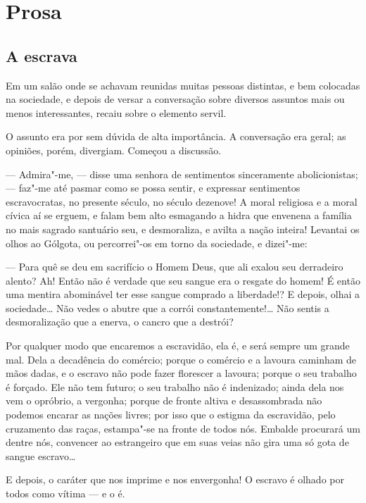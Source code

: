 \part{Prosa}

\chapter{A escrava}

Em um salão onde se achavam reunidas muitas pessoas distintas, e bem
colocadas na sociedade, e depois de versar a conversação sobre diversos
assuntos mais ou menos interessantes, recaiu sobre o elemento servil.

O assunto era por sem dúvida de alta importância. A conversação era
geral; as opiniões, porém, divergiam. Começou a discussão.

--- Admira"-me, --- disse uma senhora de sentimentos sinceramente
abolicionistas; --- faz"-me até pasmar como se possa sentir, e expressar
sentimentos escravocratas, no presente século, no século dezenove! A
moral religiosa e a moral cívica aí se erguem, e falam bem alto
esmagando a hidra que envenena a família no mais sagrado santuário seu,
e desmoraliza, e avilta a nação inteira! Levantai os olhos ao Gólgota,
ou percorrei"-os em torno da sociedade, e dizei"-me:

--- Para quê se deu em sacrifício o Homem Deus, que ali exalou seu
derradeiro alento? Ah! Então não é verdade que seu sangue era o resgate
do homem! É então uma mentira abominável ter esse sangue comprado a
liberdade!? E depois, olhai a sociedade\ldots{} Não vedes o abutre que a
corrói constantemente!\ldots{} Não sentis a desmoralização que a enerva, o
cancro que a destrói?

Por qualquer modo que encaremos a escravidão, ela é, e será sempre um
grande mal. Dela a decadência do comércio; porque o comércio e a lavoura
caminham de mãos dadas, e o escravo não pode fazer florescer a lavoura;
porque o seu trabalho é forçado. Ele não tem futuro; o seu trabalho não
é indenizado; ainda dela nos vem o opróbrio, a vergonha; porque de
fronte altiva e desassombrada não podemos encarar as nações livres; por
isso que o estigma da escravidão, pelo cruzamento das raças, estampa"-se
na fronte de todos nós. Embalde procurará um dentre nós, convencer ao
estrangeiro que em suas veias não gira uma só gota de sangue escravo\ldots{}

E depois, o caráter que nos imprime e nos envergonha! O escravo é olhado
por todos como vítima --- e o é.

